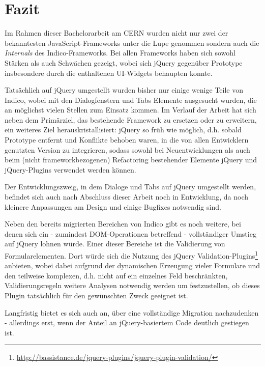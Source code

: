 \chapter{Fazit}

Im Rahmen dieser Bachelorarbeit am CERN wurden nicht nur zwei der bekanntesten JavaScript-Frameworks
unter die Lupe genommen sondern auch die \emph{Internals} des Indico-Frameworks. Bei allen
Frameworks haben sich sowohl Stärken als auch Schwächen gezeigt, wobei sich jQuery gegenüber
Prototype insbesondere durch die enthaltenen UI-Widgets behaupten konnte.

Tatsächlich auf jQuery umgestellt wurden bisher nur einige wenige Teile von Indico, wobei mit den
Dialogfenstern und Tabs Elemente ausgesucht wurden, die an möglichst vielen Stellen zum Einsatz
kommen. Im Verlauf der Arbeit hat sich neben dem Primärziel, das bestehende Framework zu ersetzen oder zu
erweitern, ein weiteres Ziel herauskristallisiert: jQuery so früh wie möglich, d.h. sobald Prototype
entfernt und Konflikte behoben waren, in die von allen Entwicklern genutzten Version zu integrieren,
sodass sowohl bei Neuentwicklungen als auch beim (nicht frameworkbezogenen) Refactoring bestehender
Elemente jQuery und jQuery-Plugins verwendet werden können.

Der Entwicklungszweig, in dem Dialoge und Tabs auf jQuery umgestellt werden, befindet sich auch nach
Abschluss dieser Arbeit noch in Entwicklung, da noch kleinere Anpassungen am Design und einige
Bugfixes notwendig sind.

Neben den bereits migrierten Bereichen von Indico gibt es noch weitere, bei denen sich ein -
zumindest DOM-Operationen betreffend - vollständiger Umstieg auf jQuery lohnen würde. Einer dieser
Bereiche ist die Validierung von Formularelementen. Dort würde sich die Nutzung des jQuery
Validation-Plugins\footnote{\href{http://bassistance.de/jquery-plugins/jquery-plugin-validation/}{http://bassistance.de/jquery-plugins/jquery-plugin-validation/}}
anbieten, wobei dabei aufgrund der dynamischen Erzeugung vieler Formulare und den teilweise
komplexen, d.h. nicht auf ein einzelnes Feld beschränkten, Validierungsregeln weitere Analysen
notwendig werden um festzustellen, ob dieses Plugin tatsächlich für den gewünschten Zweck geeignet
ist.

Langfristig bietet es sich auch an, über eine vollständige Migration nachzudenken - allerdings erst,
wenn der Anteil an jQuery-basiertem Code deutlich gestiegen ist.
